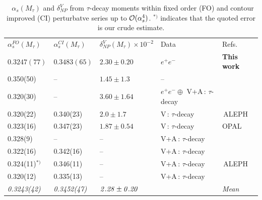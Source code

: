 \documentclass[review]{elsarticle}
\begin{document}
   {\footnotesize
\begin{table}[hbt]
\setlength{\tabcolsep}{1.1pc}
  \begin{center}
    {%
  \begin{tabular}{lllll}

&\\
\hline
\hline
$\alpha_s ^{FO}(M_\tau)$&$\alpha_s ^{CI}(M_\tau)$&$\delta^V_{NP}(M_\tau)\times 10^{-2}$  &Data& Refs.\\
 \hline 
\boldmath$0.3247(77)$&\boldmath$0.3483(65)$&\boldmath$2.30\pm 0.20$&\boldmath$e^+e^-$&{\bf This work}\\
0.350(50)&--&$1.45\pm 1.3$ &--& \cite{SNPICH} \\
0.320(30)&--& $3.60\pm 1.64$&  $e^+e^-\oplus$ V+A\,: $\tau$-decay & \cite{SN95}\\
0.320(22)&0.340(23)&$2.0\pm1.7$&V\,: $\tau$-decay&\,{\rm ALEPH}\,\cite{ALEPH}\\
0.323(16)&0.347(23)&$1.87\pm 0.54$&V\,: $\tau$-decay&{\rm OPAL}\,\cite{OPAL}\\
0.328(9)&--&--& V+A\,:  $\tau$-decay & \cite{SNTAU}\\
0.322(16)&0.342(16)&-- &V+A\,: $\tau$-decay&\cite{CHET4}\\
0.324(11)$^{*)}$&0.346(11) &--&V+A\,: $\tau$-decay&\,{\rm ALEPH}\,\cite{DAVIER}\\
0.320(12)&0.335(13)&--&V+A\,: $\tau$-decay&\cite{PICH2}\\
\hline
\it  0.3243(42) &\it 0.3452(47)&$\it 2.28\pm 0.20$&& \it Mean \\
   \hline\hline
\end{tabular}}
 \caption{ ~$\alpha_s(M_\tau)$ and $\delta^V_{NP}$ from $\tau$-decay moments within fixed order (FO) and contour improved (CI) perturbatve series up to ${\cal O}(\alpha_s^4)$. $^{*)}$ indicates that the quoted error is our crude estimate. }\label{tab:alpha_s} 
 \end{center}
\end{table}
} 
\end{document}
